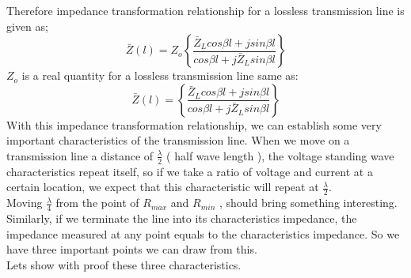 Therefore impedance transformation relationship for a lossless transmission line is given as;
\begin{equation}
\bar{Z}(l) = Z_{o}\left\lbrace \frac{\bar{Z}_Lcos\beta l + jsin\beta l}{cos\beta l + j\bar{Z}_Lsin\beta l}\right\rbrace 
\end{equation}
$Z_o$ is a real quantity for a lossless transmission line same as:
\begin{equation}
\bar{Z}(l) = \left\lbrace \frac{\bar{Z}_Lcos\beta l + jsin\beta l}{cos\beta l + j\bar{Z}_Lsin\beta l}\right\rbrace 
\end{equation}
With this impedance transformation relationship, we can establish some very important characteristics of the transmission line. When we move on a transmission line a distance of $\frac{\lambda}{2}$ ( half wave length ), the voltage standing wave characteristics repeat itself, so if we take a ratio of voltage and current at a certain location, we expect that this characteristic will repeat at $\frac{\lambda}{2}$.\\
Moving $\frac{\lambda}{4}$ from the point of $R_{max}$ and $R_{min}$ , should bring something interesting. Similarly, if we terminate the line into its characteristics impedance, the impedance measured at any point equals to the characteristics impedance. So we have three important points we can draw from this.\\
Lets show with proof these three characteristics.
